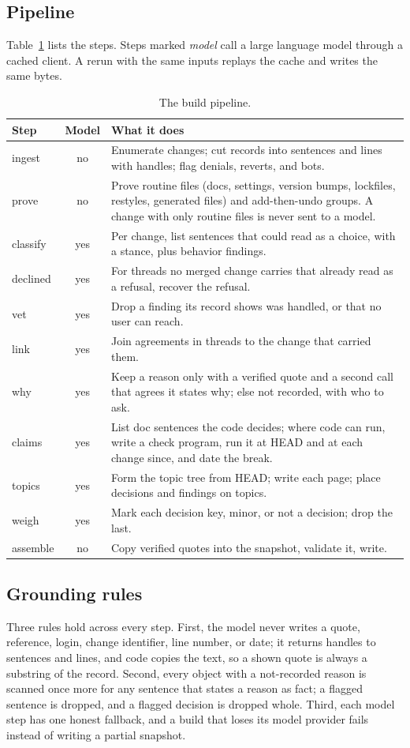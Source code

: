 \documentclass[acmsmall,screen,review]{acmart}
\begin{document}
\subsection{Pipeline}
Table~\ref{tab:pipeline} lists the steps. Steps marked \emph{model} call a large language model through a cached
client. A rerun with the same inputs replays the cache and writes the same bytes.

\begin{table}[t]
\caption{The build pipeline.}
\label{tab:pipeline}
\small
\begin{tabularx}{\linewidth}{@{}lcX@{}}
\toprule
Step & Model & What it does \\
\midrule
ingest & no & Enumerate changes; cut records into sentences and lines with handles; flag denials, reverts, and bots. \\
prove & no & Prove routine files (docs, settings, version bumps, lockfiles, restyles, generated files) and add-then-undo groups. A change with only routine files is never sent to a model. \\
classify & yes & Per change, list sentences that could read as a choice, with a stance, plus behavior findings. \\
declined & yes & For threads no merged change carries that already read as a refusal, recover the refusal. \\
vet & yes & Drop a finding its record shows was handled, or that no user can reach. \\
link & yes & Join agreements in threads to the change that carried them. \\
why & yes & Keep a reason only with a verified quote and a second call that agrees it states why; else not recorded, with who to ask. \\
claims & yes & List doc sentences the code decides; where code can run, write a check program, run it at HEAD and at each change since, and date the break. \\
topics & yes & Form the topic tree from HEAD; write each page; place decisions and findings on topics. \\
weigh & yes & Mark each decision key, minor, or not a decision; drop the last. \\
assemble & no & Copy verified quotes into the snapshot, validate it, write. \\
\bottomrule
\end{tabularx}
\end{table}

\subsection{Grounding rules}
Three rules hold across every step. First, the model never writes a quote, reference, login, change identifier, line
number, or date; it returns handles to sentences and lines, and code copies the text, so a shown quote is always a
substring of the record. Second, every object with a not-recorded reason is scanned once more for any sentence that
states a reason as fact; a flagged sentence is dropped, and a flagged decision is dropped whole. Third, each model
step has one honest fallback, and a build that loses its model provider fails instead of writing a partial snapshot.
\end{document}
